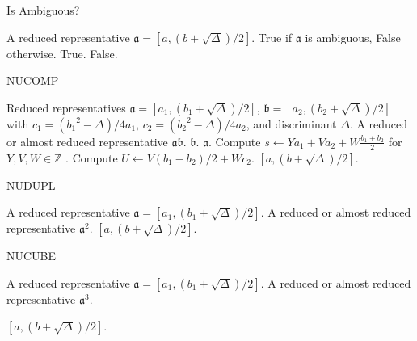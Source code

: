 \documentclass{ucalgthes1}
\theoremstyle{plain}
\theoremstyle{definition}
\newcommand{\ZZ}{\mathbb{Z}}
\begin{document}
\begin{algorithm}[h]
\caption{Is Ambiguous?}
\label{alg:ambiguous}
\begin{algorithmic}[1]
\REQUIRE A reduced representative $\mathfrak a = [a, (b+\sqrt\Delta)/2]$.
\ENSURE True if $\mathfrak a$ is ambiguous, False otherwise.
		\RETURN True.
	\ENDIF
\ENDIF
\RETURN False.
\end{algorithmic}
\end{algorithm}

\begin{algorithm}[h]
\caption{NUCOMP}
\label{alg:nucomp}
\begin{algorithmic}[1]
\REQUIRE Reduced representatives $\mathfrak a = [a_1, (b_1+\sqrt\Delta)/2]$, $\mathfrak b = [a_2, (b_2+\sqrt\Delta)/2]$ with \break $c_1 = ({b_1}^2-\Delta)/4a_1$, $c_2 = ({b_2}^2-\Delta)/4a_2$, and discriminant $\Delta$.
\ENSURE A reduced or almost reduced representative $\mathfrak a \mathfrak b$.
	\RETURN $\mathfrak b$.
	\RETURN $\mathfrak a$.
\ENDIF
\STATE Compute $s \leftarrow Ya_1 + Va_2 + W \frac{b_1+b_2}{2}$ for $Y, V, W \in \ZZ$ .
\STATE Compute $U \leftarrow V(b_1-b_2)/2 + Wc_2$.
\RETURN $[a, (b+\sqrt\Delta)/2]$.
\end{algorithmic}
\end{algorithm}

\begin{algorithm}[h]
\caption{NUDUPL}
\label{alg:nudupl}
\begin{algorithmic}[1]
\REQUIRE A reduced representative $\mathfrak a = [a_1, (b_1+\sqrt\Delta)/2]$.
\ENSURE A reduced or almost reduced representative $\mathfrak a^2$.
\RETURN $[a, (b+\sqrt\Delta)/2]$.
\end{algorithmic}
\end{algorithm}

\begin{algorithm}[h]
\caption{NUCUBE}
\label{alg:nucube}
\begin{algorithmic}[1]
\REQUIRE A reduced representative $\mathfrak a = [a_1, (b_1+\sqrt\Delta)/2]$.
\ENSURE A reduced or almost reduced representative $\mathfrak a^3$.

\RETURN $[a, (b+\sqrt\Delta)/2]$.
\end{algorithmic}
\end{algorithm}
\end{document}
